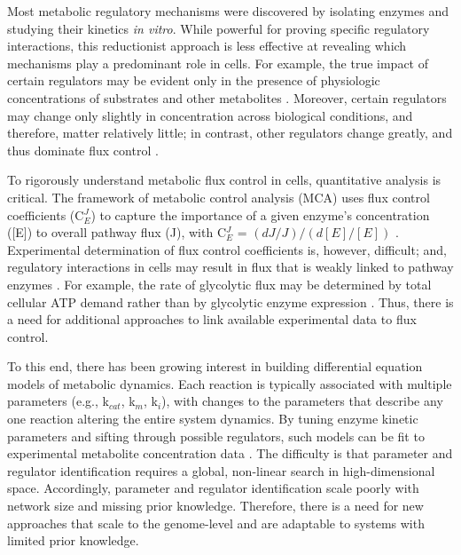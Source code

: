 Most metabolic regulatory mechanisms were discovered by isolating enzymes and studying their kinetics \textit{in vitro}. While powerful for proving specific regulatory interactions, this reductionist approach is less effective at revealing which mechanisms play a predominant role in cells. For example, the true impact of certain regulators may be evident only in the presence of physiologic concentrations of substrates and other metabolites \cite{Fell:1997wg, Tummler:2014cp}. Moreover, certain regulators may change only slightly in concentration across biological conditions, and therefore, matter relatively little; in contrast, other regulators change greatly, and thus dominate flux control \cite{Kacser:1973fe}. 

To rigorously understand metabolic flux control in cells, quantitative analysis is critical. The framework of metabolic control analysis (MCA) uses flux control coefficients (C$^{J}_{E}$) to capture the importance of a given enzyme's concentration ([E]) to overall pathway flux (J), with C$^{J}_{E}$  = $(dJ/J)/(d[E]/[E])$ \cite{Kacser:1973fe}. Experimental determination of flux control coefficients is, however, difficult; and, regulatory interactions in cells may result in flux that is weakly linked to pathway enzymes \cite{Hauf:2000vu, Kochanowski:2013fb, Fell:1997wg, CornishBowden:1995fy}. For example, the rate of glycolytic flux may be determined by total cellular ATP demand rather than by glycolytic enzyme expression \cite{Koebmann:2002ic}. Thus, there is a need for additional approaches to link available experimental data to flux control.

To this end, there has been growing interest in building differential equation models of metabolic dynamics. Each reaction is typically associated with multiple parameters (e.g., k$_{cat}$, k$_{m}$, k$_{i}$), with changes to the parameters that describe any one reaction altering the entire system dynamics. By tuning enzyme kinetic parameters and sifting through possible regulators, such models can be fit to experimental metabolite concentration data \cite{Teusink:2000kc, Chassagnole:2002ty, Tummler:2014cp}. The difficulty is that parameter and regulator identification requires a global, non-linear search in high-dimensional space. Accordingly, parameter and regulator identification scale poorly with network size and missing prior knowledge. Therefore, there is a need for new approaches that scale to the genome-level and are adaptable to systems with limited prior knowledge.

